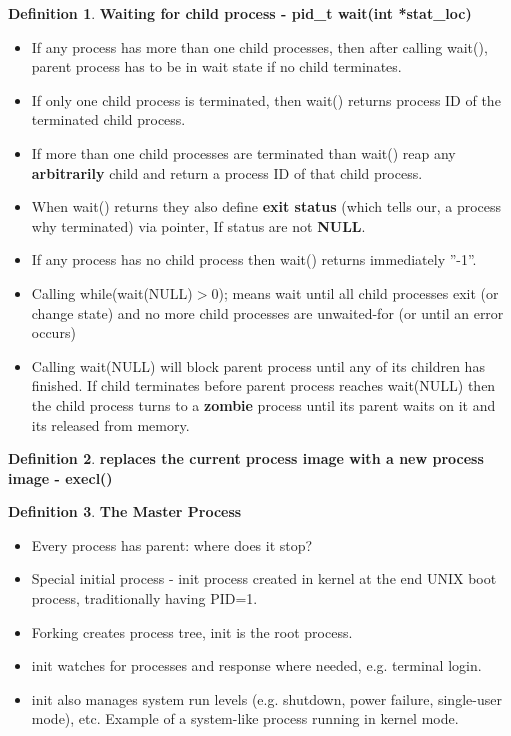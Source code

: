 \documentclass[11pt,a4paper]{article}
\theoremstyle{definition}
\newtheorem{definition}{Definition}[section]
\newenvironment{myitemize}
{ \begin{itemize}
    \setlength{\itemsep}{5pt}
    \setlength{\parskip}{0pt}
    \setlength{\parsep}{0pt}     }
{ \end{itemize}                  }
\begin{document}
\begin{definition}{\textbf{Waiting for child process - \textsf{pid\_t wait(int *stat\_loc)}}}
	\begin{myitemize}
		\item If any process has more than one child processes, then after calling \textsf{wait()}, parent process has to be in wait state if no child terminates.
		\item If only one child process is terminated, then \textsf{wait()} returns process ID of the terminated child process.
		\item If more than one child processes are terminated than \textsf{wait()} reap any \textbf{arbitrarily} child and return a process ID of that child process.
		\item When \textsf{wait()} returns they also define \textbf{exit status} (which tells our, a process why terminated) via pointer, If status are not \textbf{NULL}.
		\item If any process has no child process then \textsf{wait()} returns immediately ''-1''.
		\item Calling \textsf{while(wait(NULL)$>$0);} means wait until all child processes exit (or change state) and no more child processes are unwaited-for (or until an error occurs)
		\item Calling \textsf{wait(NULL)} will block parent process until any of its children has finished. If child terminates before parent process reaches \textsf{wait(NULL)} then the child process turns to a \textbf{zombie} process until its parent waits on it and its released from memory.
	\end{myitemize}
\end{definition}

\begin{definition}{\textbf{replaces the current process image with a new process image - \textsf{execl()}}}
	
\end{definition}

\begin{definition}{\textbf{The Master Process}}
	\begin{myitemize}
		\item Every process has parent: \textsf{where does it stop?}
		\item Special initial process - \textsf{init} process created in kernel at the end UNIX boot process, traditionally having PID=1.
		\item Forking creates process tree, \textsf{init} is the root process.
		\item \textsf{init} watches for processes and response where needed, e.g. terminal login.
		\item \textsf{init} also manages system run levels (e.g. shutdown, power failure, single-user mode), etc. Example of a system-like process running in kernel mode.
	\end{myitemize}
\end{definition}
\end{document}
